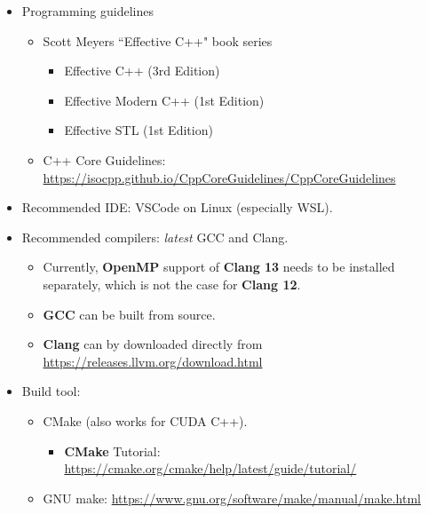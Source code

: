\documentclass{article}
\begin{document}
\begin{itemize}
\begin{itemize}
        \item Programming guidelines
        \begin{itemize}
            \item Scott Meyers ``Effective C++" book series
            \begin{itemize}
                \item Effective C++ (3rd Edition) \cite{meyers2005effective}
                \item Effective Modern C++ (1st Edition) \cite{meyers2014effective}
                \item Effective STL (1st Edition) \cite{meyers2001effective}
            \end{itemize}
            \item C++ Core Guidelines:\\ \href{https://isocpp.github.io/CppCoreGuidelines/CppCoreGuidelines}{https://isocpp.github.io/CppCoreGuidelines/CppCoreGuidelines}
        \end{itemize}
        \item Recommended IDE: VSCode on Linux (especially WSL).
        \item Recommended compilers: \emph{latest} GCC and Clang.
        \begin{itemize}
            \item Currently, \textbf{OpenMP} support of \textbf{Clang 13} needs to be installed separately, which is not the case for \textbf{Clang 12}.
            \item \textbf{GCC} can be built from source.
            \item \textbf{Clang} can by downloaded directly from \href{https://releases.llvm.org/download.html}{https://releases.llvm.org/download.html}
        \end{itemize}
        \item Build tool: 
        \begin{itemize}
            \item CMake (also works for CUDA C++).
                \begin{itemize}
                \item \textbf{CMake} Tutorial:
                \href{https://cmake.org/cmake/help/latest/guide/tutorial/}{https://cmake.org/cmake/help/latest/guide/tutorial/}
                \end{itemize}
            \item GNU make:
            \href{https://www.gnu.org/software/make/manual/make.html}{https://www.gnu.org/software/make/manual/make.html}
        \end{itemize}
        

\end{itemize}
\end{itemize}
\end{document}
